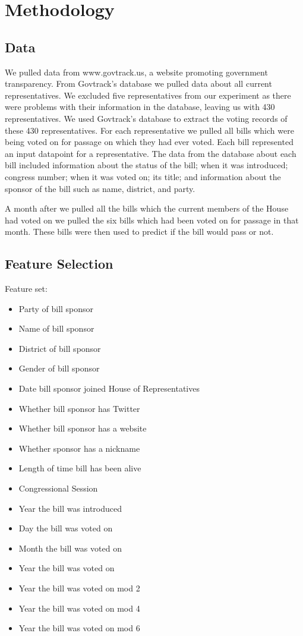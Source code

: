 \documentclass[11pt,letterpaper,twocolumn]{article}
\begin{document}
\section{Methodology}

\subsection{Data}

We pulled data from www.govtrack.us, a website promoting government transparency. From Govtrack's database we pulled data about all current representatives. We excluded five representatives from our experiment as there were problems with their information in the database, leaving us with 430 representatives. We used Govtrack's database to extract the voting records of these 430 representatives. For each representative we pulled all bills which were being voted on for passage on which they had ever voted. Each bill represented an input datapoint for a representative. The data from the database about each bill included information about the status of the bill; when it was introduced; congress number; when it was voted on; its title; and information about the sponsor of the bill such as name, district, and party. 

A month after we pulled all the bills which the current members of the House had voted on we pulled the six bills which had been voted on for passage in that month. These bills were then used to predict if the bill would pass or not.

\subsection{Feature Selection}
Feature set:
\begin{itemize}
\item Party of bill sponsor
\item Name of bill sponsor
\item District of bill sponsor
\item Gender of bill sponsor
\item Date bill sponsor joined House of Representatives
\item Whether bill sponsor has Twitter
\item Whether bill sponsor has a website
\item Whether sponsor has a nickname
\item Length of time bill has been alive
\item Congressional Session
\item Year the bill was introduced
\item Day the bill was voted on
\item Month the bill was voted on
\item Year the bill was voted on
\item Year the bill was voted on mod 2
\item Year the bill was voted on mod 4
\item Year the bill was voted on mod 6
\end{itemize}
\end{document}
